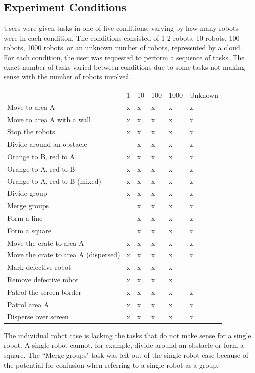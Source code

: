 \documentclass[]{article}
\begin{document}
\subsection{Experiment Conditions}

Users were given tasks in one of five conditions, varying by how many robots were in each condition. 
The conditions consisted of 1-2 robots, 10 robots, 100 robots, 1000 robots, or an unknown number of robots, represented by a cloud. 
For each condition, the user was requested to perform a sequence of tasks. 
The exact number of tasks varied between conditions due to some tasks not making sense with the number of robots involved. 

\begin{tabular}{l|l|l|l|l|l}
& 1 & 10 & 100 & 1000 & Unknown \\
Move to area A & x & x & x & x & x\\
Move to area A with a wall & x & x & x & x & x \\
Stop the robots & x & x & x & x & x\\
Divide around an obstacle & & x & x & x & x \\
Orange to B, red to A & x & x & x & x & x \\
Orange to A, red to B & x & x & x & x & x \\
Orange to A, red to B (mixed) & x & x & x & x & x \\
Divide group & x & x & x & x & x \\
Merge groups & & x & x & x & x \\
Form a line & & x & x & x & x \\
Form a square & & x & x & x & x \\
Move the crate to area A & x & x & x & x & x \\
Move the crate to area A (dispersed) & x & x & x & x & x\\
Mark defective robot & x & x & x & x & \\
Remove defective robot & x & x & x & x &  \\
Patrol the screen border & x & x & x & x & x \\
Patrol area A & x & x & x & x & x \\
Disperse over screen & x & x & x & x & x \\
\end{tabular}

The individual robot case is lacking the tasks that do not make sense for a single robot. A single robot cannot, for example, divide around an obstacle or form a square. 
The ``Merge groups" task was left out of the single robot case because of the potential for confusion when referring to a single robot as a group. 
\end{document}
